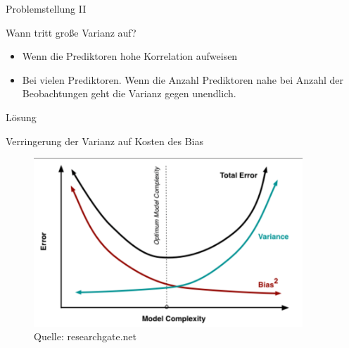 \documentclass[10pt]{beamer}
\begin{document}
\begin{frame}{Problemstellung II}
        
        \begin{Large}{Wann tritt große Varianz auf?}\end{Large}
        
        \begin{itemize}
            \item Wenn die Prediktoren hohe Korrelation aufweisen
            \item Bei vielen Prediktoren. Wenn die Anzahl Prediktoren nahe bei Anzahl der Beobachtungen geht die Varianz gegen unendlich.
        \end{itemize}
    
\end{frame}

\begin{frame}{Lösung}

    \begin{Large}{Verringerung der Varianz auf Kosten des Bias}\end{Large}

        \begin{figure}
            \centering
            \includegraphics[width=0.9\textwidth]{figures/complexity_error.png}
            \caption{Quelle: researchgate.net}
        \end{figure}
        
\end{frame}
\end{document}
